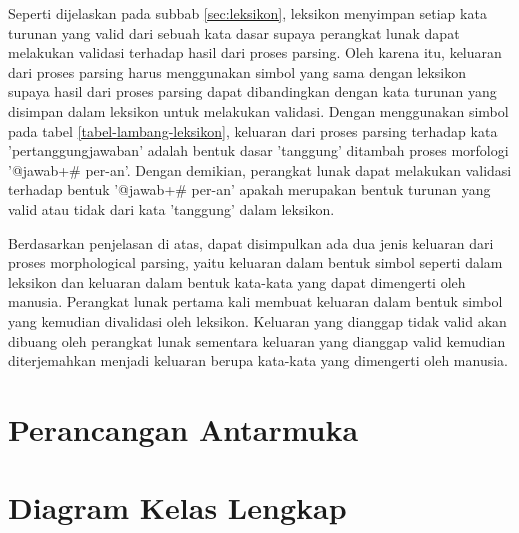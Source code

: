 Seperti dijelaskan pada subbab \ref{sec:leksikon}, leksikon menyimpan setiap kata turunan yang valid dari sebuah kata dasar supaya perangkat lunak dapat melakukan validasi terhadap hasil dari proses parsing. Oleh karena itu, keluaran dari proses parsing harus menggunakan simbol yang sama dengan leksikon supaya hasil dari proses parsing dapat dibandingkan dengan kata turunan yang disimpan dalam leksikon untuk melakukan validasi. Dengan menggunakan simbol pada tabel \ref{tabel-lambang-leksikon}, keluaran dari proses parsing terhadap kata 'pertanggungjawaban' adalah bentuk dasar 'tanggung' ditambah proses morfologi '@jawab+\# per-an'. Dengan demikian, perangkat lunak dapat melakukan validasi terhadap bentuk '@jawab+\# per-an' apakah merupakan bentuk turunan yang valid atau tidak dari kata 'tanggung' dalam leksikon.

Berdasarkan penjelasan di atas, dapat disimpulkan ada dua jenis keluaran dari proses morphological parsing, yaitu keluaran dalam bentuk simbol seperti dalam leksikon dan keluaran dalam bentuk kata-kata yang dapat dimengerti oleh manusia. Perangkat lunak pertama kali membuat keluaran dalam bentuk simbol yang kemudian divalidasi oleh leksikon. Keluaran yang dianggap tidak valid akan dibuang oleh perangkat lunak sementara keluaran yang dianggap valid kemudian diterjemahkan menjadi keluaran berupa kata-kata yang dimengerti oleh manusia.

\section{Perancangan Antarmuka}
\label{sec:perancanganAntarmuka}

\section{Diagram Kelas Lengkap}
\label{sec:DiagramKelasLengkap}